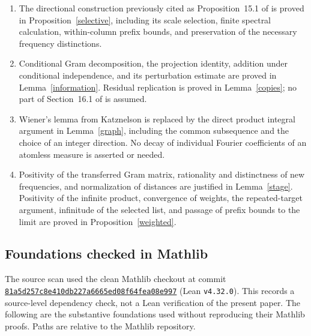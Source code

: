 \documentclass[reqno,a4paper,12pt]{amsart}
\begin{document}
\begin{enumerate}
\item The directional construction previously cited as Proposition~15.1
of \cite{FLT} is proved in Proposition~\ref{selective}, including its
scale selection, finite spectral calculation, within-column prefix
bounds, and preservation of the necessary frequency distinctions.
\item Conditional Gram decomposition, the projection identity,
addition under conditional independence, and its perturbation estimate
are proved in Lemma~\ref{information}. Residual replication is proved
in Lemma~\ref{copies}; no part of Section~16.1 of \cite{FLT} is assumed.
\item Wiener's lemma from Katznelson is replaced by the direct product
integral argument in Lemma~\ref{graph}, including the common subsequence
and the choice of an integer direction. No decay of individual Fourier
coefficients of an atomless measure is asserted or needed.
\item Positivity of the transferred Gram matrix, rationality and distinctness
of new frequencies, and normalization of distances are justified in
Lemma~\ref{stage}. Positivity of the infinite product, convergence of
weights, the repeated-target argument, infinitude of the selected list,
and passage of prefix bounds to the limit are proved in
Proposition~\ref{weighted}.
\end{enumerate}

\subsection{Foundations checked in Mathlib}
The source scan used the clean Mathlib checkout at commit
\href{https://github.com/leanprover-community/mathlib4/tree/81a5d257c8e410db227a6665ed08f64fea08e997}{\texttt{81a5d257c8e410db227a6665ed08f64fea08e997}}
(Lean \texttt{v4.32.0}). This records a source-level dependency check,
not a Lean verification of the present paper.
The following are the substantive foundations used without reproducing
their Mathlib proofs. Paths are relative to the Mathlib repository.
\end{document}
